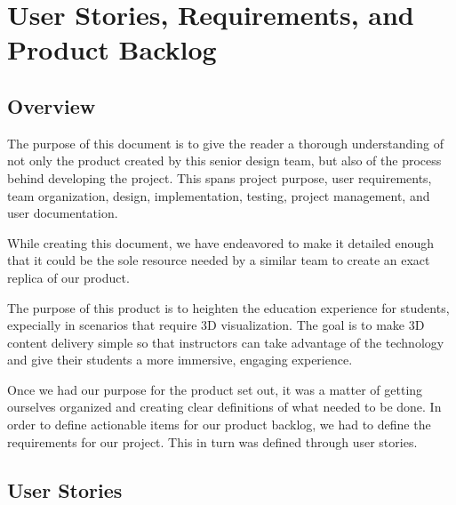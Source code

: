 
\chapter{User Stories,  Requirements, and Product Backlog}



\section{Overview}


The purpose of this document is to give the reader a thorough understanding of
not only the product created by this senior design team, but also of the
process behind developing the project. This spans project purpose, user
requirements, team organization, design, implementation, testing, project
management, and user documentation.

While creating this document, we have endeavored to make it detailed enough
that it could be the sole resource needed by a similar team to create an exact
replica of our product.

The purpose of this product is to heighten the education experience for
students, expecially in scenarios that require 3D visualization. The goal is to
make 3D content delivery simple so that instructors can take advantage of the
technology and give their students a more immersive, engaging experience.

Once we had our purpose for the product set out, it was a matter of getting
ourselves organized and creating clear definitions of what needed to be done.
In order to define actionable items for our product backlog, we had to define
the requirements for our project. This in turn was defined through user stories.




\section{User Stories}


